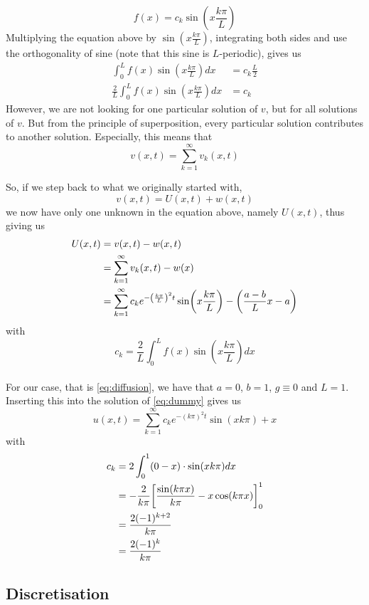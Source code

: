 \documentclass[12pt,english,a4paper]{article}
\begin{document}
\[
f(x) = c_k\sin(x\frac{k \pi}{L})
\]
Multiplying  the equation above by \(\sin(x\frac{k \pi}{L})\), integrating both sides and use the orthogonality of sine (note that this sine is \(L\)-periodic), gives us
\begin{align*}
\int_0^Lf(x)\sin(x\frac{k \pi}{L})dx &= c_k\frac{L}{2} \\
\frac{2}{L}\int_0^Lf(x)\sin(x\frac{k \pi}{L})dx &= c_k
\end{align*}
However, we are not looking for one particular solution of \(v\), but for all solutions of \(v\). But from the principle of superposition, every particular solution contributes to another solution. Especially, this means that
\[
v(x,t) = \sum_{k=1}^\infty v_k(x,t)
\]

So, if we step back to what we originally started with,
\[
v(x,t) = U(x,t) + w(x,t)
\]
we now have only one unknown in the equation above, namely \(U(x,t)\), thus giving us
\begin{align*}
 U(x,t) &= v(x,t)- w(x,t) \\
 &=  \sum_{k=1}^\infty v_k(x,t) - w(x) \\
 &=\sum_{k=1}^\infty c_ke^{-\qty(\frac{k \pi}{L})^2t}\sin(x\frac{k \pi}{L})  -\qty(\frac{a-b}{L}x - a)
\end{align*}
with
\[
c_k = \frac{2}{L}\int_0^Lf(x)\sin(x\frac{k \pi}{L})dx
\]
\hfill \\
For our case, that is \vref{eq:diffusion}, we have that \(a = 0\), \(b = 1\), \(g \equiv 0\) and \(L = 1\). Inserting this into the solution of \vref{eq:dummy} gives us
\begin{equation}\label{eq:analyticalSolution}
	u(x,t) = \sum_{k=1}^\infty c_ke^{-(k\pi)^2t}\sin(xk\pi)  + x
\end{equation}
with
\begin{align*}
c_k &= 2\int_0^1(0-x)\cdot\sin(xk\pi)dx \\
&= - \frac{2}{k\pi}\qty[\frac{\sin(k\pi x)}{k\pi} - x\cos(k\pi x)]_0^1 \\
&= \frac{2(-1)^{k+2}}{k\pi} \\
&=  \frac{2(-1)^k}{k\pi}
\end{align*}

\subsection{Discretisation}

\end{document}
